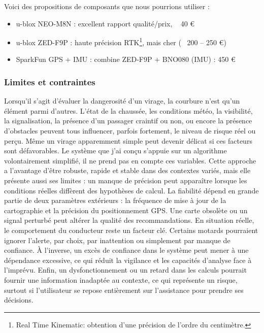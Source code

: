 Voici des propositions de composants que nous pourrions utiliser : 
\begin{itemize}
  \item u-blox NEO-M8N : excellent rapport qualité/prix, ~ 40 €
  \item u-blox ZED-F9P : haute précision RTK\footnote{Real Time Kinematic: obtention d'une précision de l’ordre du centimètre.}, mais cher (~ 200 – 250 €)
  \item SparkFun GPS + IMU : combine ZED-F9P + BNO080 (IMU) : 450 €
\end{itemize}
\vspace{0.5cm}

\subsubsection{Limites et contraintes}
Lorsqu’il s’agit d’évaluer la dangerosité d’un virage, la courbure n’est qu’un élément parmi d’autres. L’état de la chaussée, les conditions météo, la visibilité, la signalisation, la présence d'un passager craintif ou non, ou encore la présence d’obstacles peuvent tous influencer, parfois fortement, le niveau de risque réel ou perçu. Même un virage apparemment simple peut devenir délicat si ces facteurs sont défavorables.
Le système que j’ai conçu s’appuie sur un algorithme volontairement simplifié, il ne prend pas en compte ces variables. Cette approche a l’avantage d’être robuste, rapide et stable dans des contextes variés, mais elle présente aussi ses limites : un manque de précision peut apparaître lorsque les conditions réelles diffèrent des hypothèses de calcul. La fiabilité dépend en grande partie de deux paramètres extérieurs : la fréquence de mise à jour de la cartographie et la précision du positionnement GPS. Une carte obsolète ou un signal perturbé peut altérer la qualité des recommandations.
En situation réelle, le comportement du conducteur reste un facteur clé. Certains motards pourraient ignorer l’alerte, par choix, par inattention ou simplement par manque de confiance. À l’inverse, un excès de confiance dans le système peut mener à une dépendance excessive, ce qui réduit la vigilance et les capacités d’analyse face à l’imprévu.
Enfin, un dysfonctionnement ou un retard dans les calculs pourrait fournir une information inadaptée au contexte, ce qui représente un risque, surtout si l’utilisateur se repose entièrement sur l’assistance pour prendre ses décisions.
\vspace{0.5cm}

